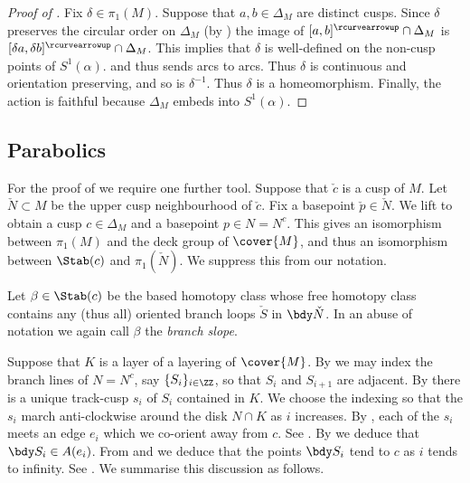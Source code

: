 \documentclass[12pt]{amsart}
\newcommand{\acw}{\rcurvearrowup}
\begin{document}
\begin{proof}[Proof of ]
Fix $\delta \in \pi_1(M)$.  Suppose that $a, b \in \Delta_M$ are distinct cusps.  Since $\delta$ preserves the circular order on $\Delta_M$ (by ) the image of $[a, b]^\acw \cap \Delta_M$ is $[\delta a, \delta b]^\acw \cap \Delta_M$.  This implies that $\delta$ is well-defined on the non-cusp points of $S^1(\alpha)$. 
and thus sends arcs to arcs.  Thus $\delta$ is continuous 
and orientation preserving, and so is $\delta^{-1}$.  Thus $\delta$ is a homeomorphism.  Finally, the action is faithful because $\Delta_M$ embeds into $S^1(\alpha)$.
\end{proof}

\subsection{Parabolics}
\label{Sec:Parabolics}

For the proof of  we require one further tool.  Suppose that $\check{c}$ is a cusp of $M$.  Let $\check{N} \subset M$ be the upper cusp neighbourhood of $\check{c}$.  Fix a basepoint $\check{p} \in \check{N}$.  We lift to obtain a cusp $c \in \Delta_M$ and a basepoint $p \in N = N^c$.  This gives an isomorphism between $\pi_1(M)$ and the deck group of $\cover{M}$, and thus an isomorphism between $\Stab(c)$ and $\pi_1(\check{N})$.  We suppress this from our notation.   

\begin{definition}
\label{Def:BranchSlope}
Let $\beta \in \Stab(c)$ be the based homotopy class whose free homotopy class contains any (thus all) oriented branch loops $\check{S}$ in $\bdy \check{N}$.  In an abuse of notation we again call $\beta$ the \emph{branch slope}.
\end{definition}

Suppose that $K$ is a layer of a layering of $\cover{M}$.  By  we may index the branch lines of $N = N^c$, say $\{S_i\}_{i \in \ZZ}$, so that $S_i$ and $S_{i+1}$ are adjacent.  By  there is a unique track-cusp $s_i$ of $S_i$ contained in $K$.  We choose the indexing so that the $s_i$ march anti-clockwise around the disk $N \cap K$ as $i$ increases. By , each of the $s_i$ meets an edge $e_i$ which we co-orient away from $c$. See .  By  we deduce that $\bdy S_i \in A(e_i)$.   From  and  we deduce that the points $\bdy S_i$ tend to $c$ as $i$ tends to infinity.  See . We summarise this discussion as follows. 
\end{document}

